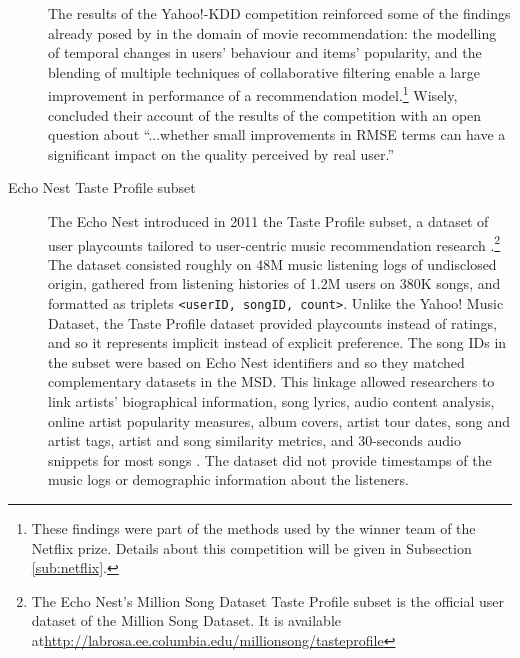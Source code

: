 \begin{description}
The results of the Yahoo!-KDD competition reinforced some of the findings already posed by \textcite{koren09collaborative,koren09bellkor,toscher09bigchaos} in the domain of movie recommendation: the modelling of temporal changes in users' behaviour and items' popularity, and the blending of multiple techniques of collaborative filtering enable a large improvement in performance of a recommendation model.\footnote{These findings were part of the methods used by the winner team of the Netflix prize. Details about this competition will be given in Subsection \ref{sub:netflix}.}
Wisely, \textcite{dror11yahoo} concluded their account of the results of the competition with an open question about ``...whether small improvements in RMSE terms can have a significant impact on the quality perceived by real user.''






\item [Echo Nest Taste Profile subset] 
The Echo Nest introduced in 2011 the Taste Profile subset, a dataset of user playcounts tailored to user-centric music recommendation research \autocite{mcfee12million}.\footnote{The Echo Nest's Million Song Dataset Taste Profile subset is the official user dataset of the Million Song Dataset. It is available at\url{http://labrosa.ee.columbia.edu/millionsong/tasteprofile}}
The dataset consisted roughly on 48M music listening logs of undisclosed origin, gathered from  listening histories of 1.2M users on 380K songs, and formatted as triplets \texttt{<userID, songID, count>}. Unlike the Yahoo! Music Dataset, the Taste Profile dataset provided playcounts instead of ratings, and so it represents implicit instead of explicit preference. The song IDs in the subset were based on Echo Nest identifiers and so they matched complementary datasets in the MSD. This linkage allowed researchers to link artists' biographical information, song lyrics, audio content analysis, online artist popularity measures, album covers, artist tour dates, song and artist tags, artist and song similarity metrics, and 30-seconds audio snippets for most songs \autocite{bertin11million}. The dataset did not provide timestamps of the music logs or demographic information about the listeners.


\end{description}
